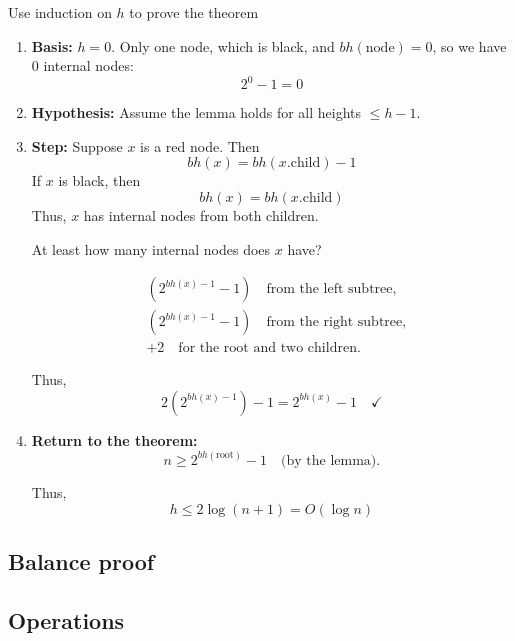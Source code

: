 \begin{derivation}
    Use induction on \( h \) to prove the theorem

    \begin{enumerate}
        \item  \textbf{Basis:} \( h = 0 \). Only one node, which is black, and \( bh(\text{node}) = 0 \), so we have 0 internal nodes:
        \[
        2^0 - 1 = 0 
        \]
    
        \item \textbf{Hypothesis:} Assume the lemma holds for all heights \( \leq h-1 \).
        
        \item \textbf{Step:} Suppose \( x \) is a red node. Then 
            \[
            bh(x) = bh(x.\text{child}) - 1
            \]
            If \( x \) is black, then
            \[
            bh(x) = bh(x.\text{child})
            \]
            Thus, \( x \) has internal nodes from both children.
            \vspace{1em}
            
            At least how many internal nodes does \( x \) have?
        
            \[
            \begin{aligned}
                & (2^{bh(x)-1} - 1) \quad \text{from the left subtree}, \\
                & (2^{bh(x)-1} - 1) \quad \text{from the right subtree}, \\
                & + 2 \quad \text{for the root and two children}.
            \end{aligned}
            \]
        
            Thus,
            \[
            2(2^{bh(x)-1}) - 1 = 2^{bh(x)} - 1 \quad \checkmark
            \]
        
        \item \textbf{Return to the theorem:}
            \[
            n \geq 2^{bh(\text{root})} - 1 \quad \text{(by the lemma)}.
            \]
        
            Thus,
            \[
            h \leq 2 \log(n+1) = O(\log n)
            \]
    \end{enumerate}
\end{derivation}

\subsection{Balance proof}

\subsection{Operations}